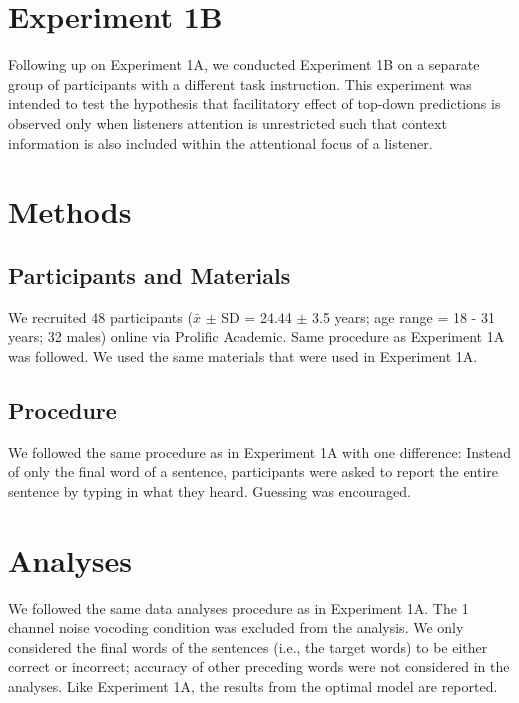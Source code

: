 \documentclass[a4paper, nobind]{templates/ociamthesis}
\begin{document}
\hypertarget{experiment1b}{%
\section{Experiment 1B}\label{experiment1b}}

Following up on Experiment 1A, we conducted Experiment 1B on a separate group of participants with a different task instruction.
This experiment was intended to test the hypothesis that facilitatory effect of top-down predictions is observed only when listeners attention is unrestricted such that context information is also included within the attentional focus of a listener.

\hypertarget{methods-1}{%
\section{Methods}\label{methods-1}}

\hypertarget{participants-and-materials}{%
\subsection{Participants and Materials}\label{participants-and-materials}}

We recruited 48 participants (\(\bar{x}\) \(\pm\) SD = 24.44 \(\pm\) 3.5 years; age range = 18 - 31 years; 32 males) online via Prolific Academic.
Same procedure as Experiment 1A was followed.
We used the same materials that were used in Experiment 1A.

\hypertarget{procedure-1}{%
\subsection{Procedure}\label{procedure-1}}

We followed the same procedure as in Experiment 1A with one difference:
Instead of only the final word of a sentence, participants were asked to report the entire sentence by typing in what they heard.
Guessing was encouraged.

\hypertarget{analyses-1}{%
\section{Analyses}\label{analyses-1}}

We followed the same data analyses procedure as in Experiment 1A.
The 1 channel noise vocoding condition was excluded from the analysis.
We only considered the final words of the sentences (i.e., the target words) to be either correct or incorrect; accuracy of other preceding words were not considered in the analyses.
Like Experiment 1A, the results from the optimal model are reported.
\end{document}
